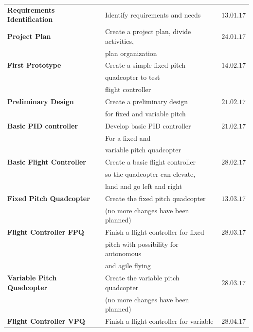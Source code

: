 \begin{table}[h]
\begin{tabular}{llc}
\rowcolor{gainsboro}
\textbf{Requirements Identification} & Identify requirements and needs & $13.01.17$ \\
\textbf{Project Plan} & Create a project plan, divide activities, & $24.01.17$ \\
                                     & plan organization & \\
\rowcolor{gainsboro}
\textbf{First Prototype} & Create a simple fixed pitch & $14.02.17$ \\\rowcolor{gainsboro}
                         & quadcopter to test & \\\rowcolor{gainsboro}
                         & flight controller & \\
\textbf{Preliminary Design} & Create a preliminary design & $21.02.17$ \\
                            & for fixed and variable pitch & \\\rowcolor{gainsboro}
\textbf{Basic PID controller} & Develop basic PID controller & $21.02.17$ \\\rowcolor{gainsboro}
                                 & For a fixed and & \\\rowcolor{gainsboro}
                                 & variable pitch quadcopter & \\
\textbf{Basic Flight Controller} & Create a basic flight controller & $28.02.17$ \\
                                 & so the quadcopter can elevate, & \\
                                 & land and go left and right & \\\rowcolor{gainsboro}
\textbf{Fixed Pitch Quadcopter} & Create the fixed pitch quadcopter & $13.03.17$ \\\rowcolor{gainsboro}
                                & (no more changes have been planned) & \\
\textbf{Flight Controller FPQ}  & Finish a flight controller for fixed & $28.03.17$ \\
                                & pitch with possibility for autonomous & \\
                                & and agile flying & \\\rowcolor{gainsboro}
\textbf{Variable Pitch Quadcopter}  & Create the variable pitch quadcopter & $28.03.17$ \\\rowcolor{gainsboro}
                                    & (no more changes have been planned) & \\
\textbf{Flight Controller VPQ}  & Finish a flight controller for variable & $28.04.17$ \\

\end{tabular}
\end{table}
